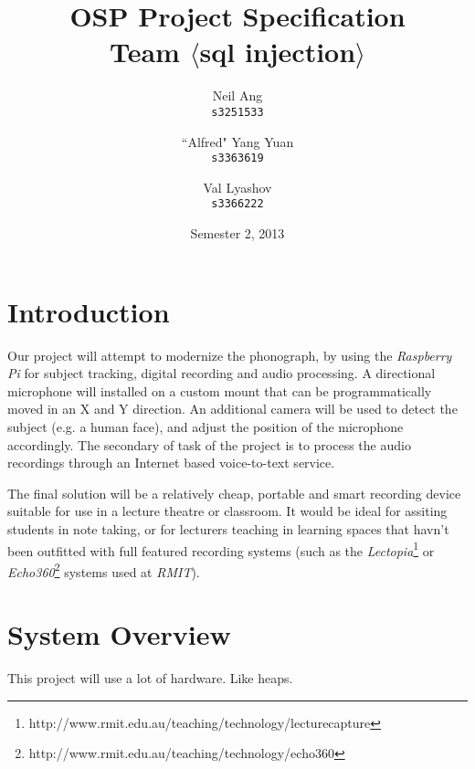 \documentclass[11pt,a4paper,titlepage]{report}
\title{OSP Project Specification \\ Team $\langle$sql injection$\rangle$}
\author{
  Neil Ang\\
  \texttt{s3251533}
  \and
  ``Alfred" Yang Yuan\\
  \texttt{s3363619}
  \and
  Val Lyashov\\
  \texttt{s3366222}
}
\date{Semester 2, 2013}
\newcommand{\rpi}{\textit{Raspberry Pi\textsuperscript{\textregistered}}}
\begin{document}
\maketitle

\pagebreak
\tableofcontents
\thispagestyle{empty}
\pagebreak

\section{Introduction}

Our project will attempt to modernize the phonograph, by using the \rpi\xspace for subject tracking, digital recording and audio processing. A directional microphone will installed on a custom mount that can be programmatically moved in an X and Y direction. An additional camera will be used to detect the subject (e.g. a human face), and adjust the position of the microphone accordingly. The secondary of task of the project is to process the audio recordings through an Internet based voice-to-text service.

The final solution will be a relatively cheap, portable and smart recording device suitable for use in a lecture theatre or classroom. It would be ideal for assiting students in note taking, or for lecturers teaching in learning spaces that havn't been outfitted with full featured recording systems (such as the \textit{Lectopia}\footnote{http://www.rmit.edu.au/teaching/technology/lecturecapture} or \textit{Echo360}\footnote{http://www.rmit.edu.au/teaching/technology/echo360} systems used at \textit{RMIT}).


\section{System Overview}

This project will use a lot of hardware. Like heaps.
\end{document}
